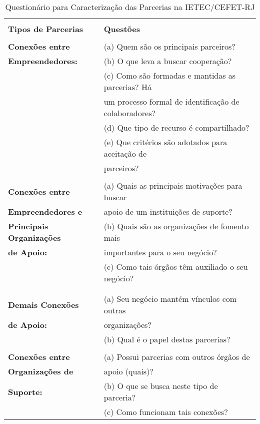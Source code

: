 \begin{table}
	\centering
	
	\caption{Questionário para Caracterização das Parcerias na IETEC/CEFET-RJ \cite{escalfoni-irineu-oliveira:2017}}
	\begin{tabular}{|l|l|} 
		\hline
		\cellcolor{lightgray!25}
		&
		\cellcolor{lightgray!25}
		\\
		\cellcolor{lightgray!25}
		\textbf{Tipos de Parcerias} 
		& 
		\cellcolor{lightgray!25}
		\textbf{Questões} 
		\\[6pt]
		\hline
		&
		\\
		\textbf{Conexões entre}
		& (a) Quem são os principais parceiros? \\
		\textbf{Empreendedores:}
		& (b) O que leva a buscar cooperação? \\
		& (c) Como são formadas e mantidas as parcerias? Há \\
		& um processo formal de identificação de colaboradores? \\
		& (d) Que tipo de recurso é compartilhado? \\
		& (e) Que critérios são adotados para aceitação de \\
		& parceiros?
		\\[6pt] 
		\hline
		&
		\\
		\textbf{Conexões entre }
		& (a) Quais as principais motivações para buscar \\
		\textbf{Empreendedores e }
		& apoio de um instituições de suporte? \\
		\textbf{Principais Organizações}
		& (b) Quais são as organizações de fomento mais\\ 
		\textbf{de Apoio:}
		& importantes para o seu negócio? \\
		
		& (c) Como tais órgãos têm auxiliado o seu negócio?\\

		&
		\\[6pt] 
		\hline
		&
		\\
		\textbf{Demais Conexões}
		& (a) Seu negócio mantém vínculos com outras\\ 
		\textbf{de Apoio:}
		& organizações? 
		\\
		
		& (b) Qual é o papel destas parcerias?
		\\[6pt] 
		\hline
		&
		\\
		\textbf{Conexões entre }
		& (a) Possui parcerias com outros órgãos de  \\
		\textbf{Organizações de}
		&apoio (quais)?
		\\
		\textbf{Suporte:}
		& (b) O que se busca neste tipo de parceria? \\

		& (c) Como funcionam tais conexões?		 
		\\[6pt] 
		\hline
	\end{tabular}
	\label{questoes-ietec}
\end{table}

